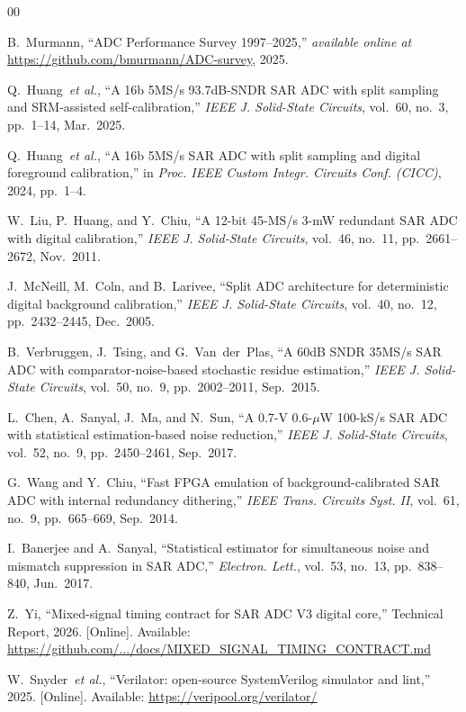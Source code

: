 \documentclass[journal]{IEEEtran}
\begin{document}
\begin{thebibliography}{00}

B.~Murmann, ``ADC Performance Survey 1997--2025,''
\textit{available online at} \url{https://github.com/bmurmann/ADC-survey},
2025.

Q.~Huang~\textit{et al.}, ``A 16b 5MS/s 93.7dB-SNDR SAR ADC with split sampling
and SRM-assisted self-calibration,'' \textit{IEEE J. Solid-State Circuits},
vol.~60, no.~3, pp.~1--14, Mar.~2025.

Q.~Huang~\textit{et al.}, ``A 16b 5MS/s SAR ADC with split sampling and
digital foreground calibration,'' in \textit{Proc. IEEE Custom Integr. Circuits
Conf. (CICC)}, 2024, pp.~1--4.

W.~Liu, P.~Huang, and Y.~Chiu, ``A 12-bit 45-MS/s 3-mW redundant SAR ADC with
digital calibration,'' \textit{IEEE J. Solid-State Circuits}, vol.~46, no.~11,
pp.~2661--2672, Nov.~2011.

J.~McNeill, M.~Coln, and B.~Larivee, ``Split ADC architecture for deterministic
digital background calibration,'' \textit{IEEE J. Solid-State Circuits},
vol.~40, no.~12, pp.~2432--2445, Dec.~2005.

B.~Verbruggen, J.~Tsing, and G.~Van~der~Plas, ``A 60dB SNDR 35MS/s SAR ADC
with comparator-noise-based stochastic residue estimation,''
\textit{IEEE J. Solid-State Circuits}, vol.~50, no.~9, pp.~2002--2011,
Sep.~2015.

L.~Chen, A.~Sanyal, J.~Ma, and N.~Sun, ``A 0.7-V 0.6-$\mu$W 100-kS/s SAR ADC
with statistical estimation-based noise reduction,'' \textit{IEEE J. Solid-State
Circuits}, vol.~52, no.~9, pp.~2450--2461, Sep.~2017.

G.~Wang and Y.~Chiu, ``Fast FPGA emulation of background-calibrated SAR ADC
with internal redundancy dithering,'' \textit{IEEE Trans. Circuits Syst. II},
vol.~61, no.~9, pp.~665--669, Sep.~2014.

I.~Banerjee and A.~Sanyal, ``Statistical estimator for simultaneous noise and
mismatch suppression in SAR ADC,'' \textit{Electron. Lett.}, vol.~53, no.~13,
pp.~838--840, Jun.~2017.

Z.~Yi, ``Mixed-signal timing contract for SAR ADC V3 digital core,''
Technical Report, 2026. [Online]. Available:
\url{https://github.com/.../docs/MIXED_SIGNAL_TIMING_CONTRACT.md}

W.~Snyder~\textit{et al.}, ``Verilator: open-source SystemVerilog simulator and
lint,'' 2025. [Online]. Available: \url{https://veripool.org/verilator/}

\end{thebibliography}
\end{document}
